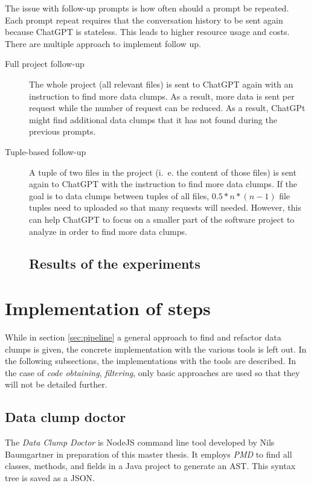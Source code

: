 The issue  with follow-up prompts is how often should a prompt be repeated. Each prompt repeat requires that the conversation history to be sent again because ChatGPT is stateless. This leads to higher resource usage and costs. There are multiple approach to implement follow up.
\begin{description}
\item[Full project follow-up] The whole project (all relevant files) is sent to  ChatGPT again with an instruction to find more data clumps. As a result, more data is sent per  request while the number of request can be reduced. As a  result, ChatGPt might find additional data clumps that it has not found during the previous prompts.
\item [Tuple-based follow-up] A tuple of two files in the project (i.~e. the content of those files) is sent again to ChatGPT with the instruction to find more data clumps. If the goal is to data clumps between tuples of all files, $0.5*n*(n-1)$ file tuples need to uploaded so that many requests will needed. However, this can help ChatGPT to focus on a smaller part of the software project to analyze in order to find more data clumps.

\subsection{Results of the experiments}\label{sec:initial_experiments}

\end{description}
\section{Implementation of steps}
While in section \ref{sec:pipeline} a general approach to find and refactor data clumps is given, the concrete implementation with the various tools is left out. In the following subsections, the implementations with the tools are described. In the case of \textit{code obtaining}, \textit{filtering}, only basic approaches are used so that they will not be detailed further. 


\subsection{Data clump doctor}

The  \textit{Data Clump Doctor} is NodeJS command line tool developed by Nils Baumgartner in preparation of this master thesis. It employs \textit{PMD} to find all classes, methods, and fields in a Java project to generate an \ac{AST}. This syntax tree is saved as a \ac{JSON}. 

